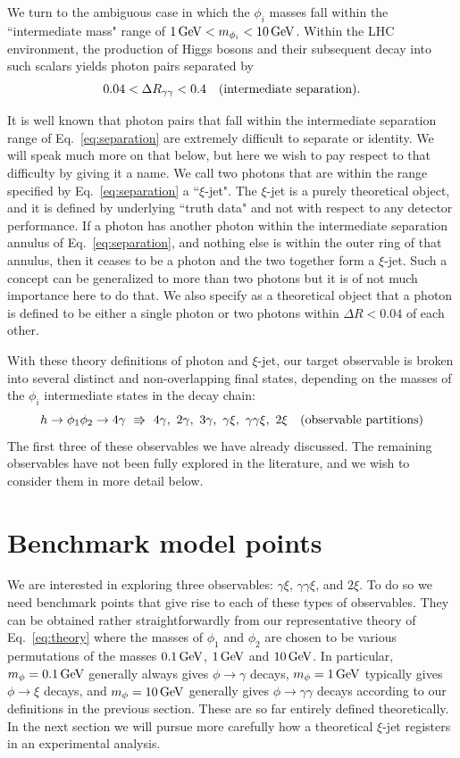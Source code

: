 \documentclass[letter,12pt]{article}
\def\beq{\begin{equation}}
\def\eeq{\end{equation}}
\def\gev{\, {\rm GeV}}
\begin{document}
We turn to the ambiguous case in which the $\phi_i$ masses fall within the ``intermediate mass" range of $1\gev < m_{\phi_i}<10\gev$. Within the LHC environment, the production of Higgs bosons and their subsequent decay into such scalars yields photon pairs separated by
\beq
0.04<\Delta R_{\gamma\gamma}<0.4~~~{\rm (intermediate~separation).}
\label{eq:separation}
\eeq

It is well known that photon pairs that fall within the intermediate separation range of Eq.~\ref{eq:separation} are extremely difficult to separate or identity. We will speak much more on that below, but here we wish to pay respect to that difficulty by giving it a name. We call two photons that are within the range specified by Eq.~\ref{eq:separation} a ``$\xi$-jet". The $\xi$-jet is a purely theoretical object, and it is defined by underlying ``truth data" and not with respect to any detector performance. If a photon has another photon within the intermediate separation annulus of Eq.~\ref{eq:separation}, and nothing else is within the outer ring of that annulus, then it ceases to be a photon and the two together form a $\xi$-jet. Such a concept can be generalized to more than two photons but it is of not much importance here to do that. We also specify as a theoretical object that a photon is defined to be either a single photon or two photons within $\Delta R<0.04$ of each other. 

With these theory definitions of photon and $\xi$-jet, our target observable is broken into several distinct and non-overlapping final states, depending on the masses of the $\phi_i$ intermediate states in the decay chain:
\beq
h\to\phi_1\phi_2\to 4\gamma~ \Rrightarrow ~4\gamma,~ 2\gamma,~ 3\gamma,~  \gamma\xi,~ \gamma\gamma\xi,~ 2\xi ~~~{\rm (observable~partitions)}
\label{eq:partitions}
\eeq
The first three of these observables we have already discussed. The remaining observables have not been fully explored in the literature, and we wish to consider them in more detail below.


\section{Benchmark model points}

We are interested in exploring three observables: $\gamma\xi$, $\gamma\gamma\xi$, and  $2\xi$. To do so we need benchmark points that give rise to each of these types of observables. They can be obtained rather straightforwardly from our representative theory of Eq.~\ref{eq:theory} where the masses of $\phi_1$ and $\phi_2$ are chosen to be various permutations of  the masses $0.1\gev$, $1\gev$ and $10\gev$. In particular, $m_\phi=0.1\gev$ generally always gives $\phi\to\gamma$ decays, $m_\phi=1\gev$ typically gives $\phi\to\xi$ decays, and $m_\phi=10\gev$ generally gives $\phi\to\gamma\gamma$ decays according to our definitions in the previous section. These are so far entirely defined theoretically. In the next section we will pursue more carefully how a theoretical $\xi$-jet registers in an experimental analysis.
\end{document}
